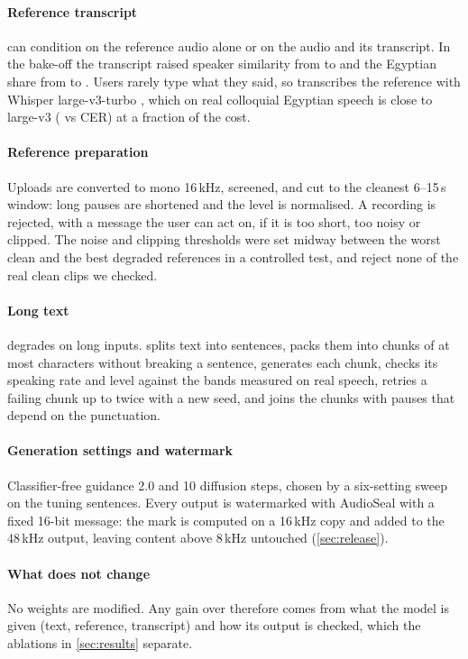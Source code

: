 \paragraph{Reference transcript}
\vox can condition on the reference audio alone or on the audio and its transcript. In the bake-off the transcript
raised speaker similarity from  to  and the Egyptian share from
 to . Users rarely type what they said, so \BA transcribes the
reference with Whisper large-v3-turbo \citep{openai2024whisperturbo}, which on real colloquial Egyptian speech is
close to large-v3 ( vs  CER) at a fraction of the cost.

\paragraph{Reference preparation}
Uploads are converted to mono 16\,kHz, screened, and cut to the cleanest 6--15\,s window: long pauses are shortened
and the level is normalised. A recording is rejected, with a message the user can act on, if it is too short, too
noisy or clipped. The noise and clipping thresholds were set midway between the worst clean and the best degraded
references in a controlled test, and reject none of the  real clean clips we checked.

\paragraph{Long text}
\vox degrades on long inputs. \BA splits text into sentences, packs them into chunks of at most
 characters without breaking a sentence, generates each chunk, checks its speaking rate and level
against the bands measured on real speech, retries a failing chunk up to twice with a new seed, and joins the chunks
with pauses that depend on the punctuation.

\paragraph{Generation settings and watermark}
Classifier-free guidance 2.0 and 10 diffusion steps, chosen by a six-setting sweep on the tuning sentences. Every
output is watermarked with AudioSeal \citep{sanroman2024audioseal} with a fixed 16-bit message: the mark is computed on
a 16\,kHz copy and added to the 48\,kHz output, leaving content above 8\,kHz untouched (\cref{sec:release}).

\paragraph{What \BA does not change}
No weights are modified. Any gain over \vox therefore comes from what the model is given (text, reference, transcript)
and how its output is checked, which the ablations in \cref{sec:results} separate.
